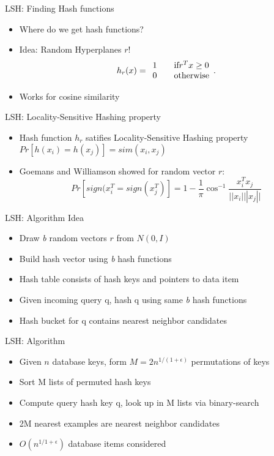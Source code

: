 \documentclass[12pt,a4paper]{beamer}
\begin{document}
\begin{frame}{LSH: Finding Hash functions}
\begin{itemize}
\item Where do we get hash functions?
\item Idea: Random Hyperplanes $r$!
$$h_r(x)= \begin{array}{l l}
    1 & \quad \text{if} r^Tx \geq 0\\
    0 & \quad \text{otherwise}
  \end{array} .$$
\item Works for cosine similarity
\end{itemize}
\end{frame}

\begin{frame}{LSH: Locality-Sensitive Hashing property}
\begin{itemize}
\item Hash function $h_r$ satifies Locality-Sensitive Hashing property $Pr[h(x_i)=h(x_j)]=sim(x_i,x_j)$
\item Goemans and Williamson showed for random vector $r$:
$$Pr[sign(x^T_{i}=sign(x^T_{j})]=1-\frac{1}{\pi}\cos^{-1}\frac{x^{T}_{i} x_{j}}{||x_{i}| ||x_{j}||}$$
\end{itemize}
\end{frame}


\begin{frame}{LSH: Algorithm Idea}
\begin{itemize}
\item Draw \textit{b} random vectors $r$ from $N(0,I)$
\item Build hash vector using \textit{b} hash functions
\item Hash table consists of hash keys and pointers to data item
\item Given incoming query q, hash q using same \textit{b} hash functions
\item Hash bucket for q contains nearest neighbor candidates
\end{itemize}
\end{frame}

\begin{frame}{LSH: Algorithm}
\begin{itemize}
\item Given $n$ database keys, form $M=2n^{1/(1+\epsilon)}$ permutations of keys
\item Sort M lists of permuted hash keys
\item Compute query hash key q, look up in M lists via binary-search
\item 2M nearest examples are nearest neighbor candidates
\item $O(n^{1/1+\epsilon})$ database items considered
\end{itemize}
\end{frame}
\end{document}
